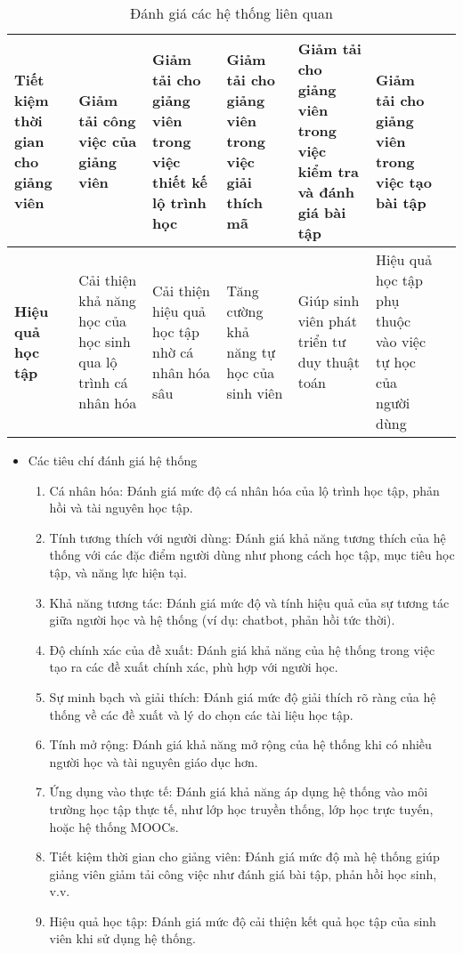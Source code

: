 \begin{table}[ht]
{\begin{tabular}{|p{3.5cm}|p{3.5cm}|p{3.5cm}|p{3.5cm}|p{3.5cm}|p{3.5cm}|p{3.5cm}|}
    \textbf{Tiết kiệm thời gian cho giảng viên} & Giảm tải công việc của giảng viên & Giảm tải cho giảng viên trong việc thiết kế lộ trình học & Giảm tải cho giảng viên trong việc giải thích mã & Giảm tải cho giảng viên trong việc kiểm tra và đánh giá bài tập & Giảm tải cho giảng viên trong việc tạo bài tập \\ \hline
    \textbf{Hiệu quả học tập} & Cải thiện khả năng học của học sinh qua lộ trình cá nhân hóa & Cải thiện hiệu quả học tập nhờ cá nhân hóa sâu & Tăng cường khả năng tự học của sinh viên & Giúp sinh viên phát triển tư duy thuật toán & Hiệu quả học tập phụ thuộc vào việc tự học của người dùng \\ \hline
    \end{tabular}
    }
    \caption{Đánh giá các hệ thống liên quan}
    \end{table}
\begin{itemize}
    \item Các tiêu chí đánh giá hệ thống
    \begin{enumerate}
        \item Cá nhân hóa: Đánh giá mức độ cá nhân hóa của lộ trình học tập, phản hồi và tài nguyên học tập.
        \item Tính tương thích với người dùng: Đánh giá khả năng tương thích của hệ thống với các đặc điểm người dùng như phong cách học tập, mục tiêu học tập, và năng lực hiện tại.
        \item Khả năng tương tác: Đánh giá mức độ và tính hiệu quả của sự tương tác giữa người học và hệ thống (ví dụ: chatbot, phản hồi tức thời).
        \item Độ chính xác của đề xuất: Đánh giá khả năng của hệ thống trong việc tạo ra các đề xuất chính xác, phù hợp với người học.
        \item Sự minh bạch và giải thích: Đánh giá mức độ giải thích rõ ràng của hệ thống về các đề xuất và lý do chọn các tài liệu học tập.
        \item Tính mở rộng: Đánh giá khả năng mở rộng của hệ thống khi có nhiều người học và tài nguyên giáo dục hơn.
        \item Ứng dụng vào thực tế: Đánh giá khả năng áp dụng hệ thống vào môi trường học tập thực tế, như lớp học truyền thống, lớp học trực tuyến, hoặc hệ thống MOOCs.
        \item Tiết kiệm thời gian cho giảng viên: Đánh giá mức độ mà hệ thống giúp giảng viên giảm tải công việc như đánh giá bài tập, phản hồi học sinh, v.v.
        \item Hiệu quả học tập: Đánh giá mức độ cải thiện kết quả học tập của sinh viên khi sử dụng hệ thống.
    \end{enumerate}
\end{itemize}
